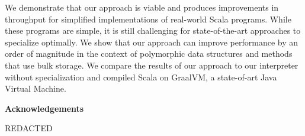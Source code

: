 We demonstrate that our approach is viable and produces improvements in throughput for simplified implementations of real-world Scala programs.
While these programs are simple, it is still challenging for state-of-the-art approaches to specialize optimally.
We show that our approach can improve performance by an order of magnitude in the context of polymorphic data structures and methods that use bulk storage.
We compare the results of our approach to our interpreter without specialization and compiled Scala on GraalVM, a state-of-art Java Virtual Machine.

\cleardoublepage


\begin{center}\textbf{Acknowledgements}\end{center}

REDACTED
\cleardoublepage

\renewcommand\contentsname{Table of Contents}
\tableofcontents
\cleardoublepage
{}    %

\listoffigures
\cleardoublepage
{}		%

\printglossaries
\cleardoublepage
{}		%


